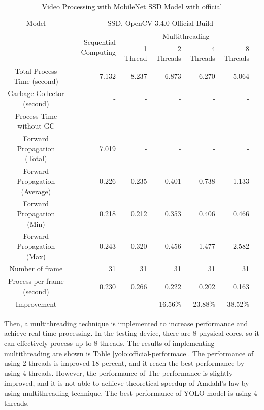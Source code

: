             \begin{table}[!htp]\centering
                \scriptsize
                \begin{tabular}{lrrrrrrr}\toprule
                    \multicolumn{2}{c}{Model} &\multicolumn{5}{c}{SSD, OpenCV 3.4.0 Official Build} \\\cmidrule{1-7}
                    \multicolumn{2}{c}{\multirow{2}{*}{}} &\multirow{2}{*}{Sequential Computing} &\multicolumn{4}{c}{Multithreading} \\\cmidrule{4-7}
                    & & &1 Thread &2 Threads &4 Threads &8 Threads \\\midrule
                    \multicolumn{2}{c}{Total Process Time (second)} &7.132 &8.237 &6.873 &6.270 &5.064 \\
                    \multicolumn{2}{c}{Garbage Collector (second)} &- &- &- &- &- \\
                    \multicolumn{2}{c}{Process Time without GC} &- &- &- &- &- \\
                    \multicolumn{2}{c}{Forward Propagation (Total)} &7.019 &- &- &- &- \\
                    \multicolumn{2}{c}{Forward Propagation (Average)} &0.226 &0.235 &0.401 &0.738 &1.133 \\
                    \multicolumn{2}{c}{Forward Propagation (Min)} &0.218 &0.212 &0.353 &0.406 &0.466 \\
                    \multicolumn{2}{c}{Forward Propagation (Max)} &0.243 &0.320 &0.456 &1.477 &2.582 \\
                    \multicolumn{2}{c}{Number of frame} &31 &31 &31 &31 &31 \\
                    \multicolumn{2}{c}{Process per frame (second)} &0.230 &0.266 &0.222 &0.202 &0.163 \\
                    \multicolumn{2}{c}{Improvement} & & &16.56\% &23.88\% &38.52\% \\
                    \bottomrule
                \end{tabular}

                \caption{Video Processing with MobileNet SSD Model with official}\label{ssd:official-performace}
            \end{table}

            Then, a multithreading technique is implemented to increase performance and achieve real-time processing.
            In the testing device, there are 8 physical cores, so it can effectively process up to 8 threads.
            The results of implementing multithreading are shown is Table \ref{yolo:official-performace}.
            The performance of using 2 threads is improved 18 percent, and it reach the best performance by using 4 threads.
            However, the performance of
            The performance is slightly improved, and it is not able to achieve theoretical speedup of Amdahl's law by using multithreading technique.
            The best performance of YOLO model is using 4 threads.


